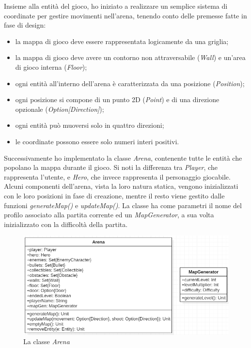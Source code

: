 Insieme alla entità del gioco, ho iniziato a realizzare un semplice sistema di coordinate per gestire movimenti nell'arena, tenendo conto delle premesse fatte in fase di design:
\begin{itemize}
    \item la mappa di gioco deve essere rappresentata logicamente da una griglia;
    \item la mappa di gioco deve avere un contorno non attraversabile (\textit{Wall}) e un'area di gioco interna (\textit{Floor});
    \item ogni entità all'interno dell'arena è caratterizzata da una posizione (\textit{Position});
    \item ogni posizione si compone di un punto 2D (\textit{Point}) e di una direzione opzionale (\textit{Option[Direction]});
    \item ogni entità può muoversi solo in quattro direzioni;
    \item le coordinate possono essere solo numeri interi positivi.
\end{itemize}

Successivamente ho implementato la classe \textit{Arena}, contenente tutte le entità che popolano la mappa durante il gioco. Si noti la differenza tra \textit{Player}, che rappresenta l'utente, e \textit{Hero}, che invece rappresenta il personaggio giocabile. Alcuni componenti dell'arena, vista la loro natura statica, vengono inizializzati con le loro posizioni in fase di creazione, mentre il resto viene gestito dalle funzioni \textit{generateMap()} e \textit{updateMap()}. La classe ha come parametri il nome del profilo associato alla partita corrente ed un \textit{MapGenerator}, a sua volta inizializzato con la difficoltà della partita.

\begin{figure}[H]
  \includegraphics[width=14cm]{res/arenaClass.png}
  \caption{La classe \textit{Arena}}
  \label{arenaCLass}
\end{figure}

